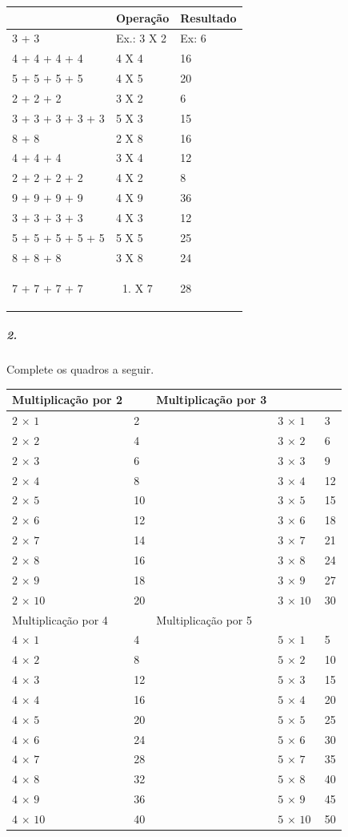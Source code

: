 \begin{longtable}[]{@{}lll@{}}
\toprule
& Operação & Resultado\tabularnewline
\midrule
\endhead
3 + 3 & Ex.: 3 X 2 & Ex: 6\tabularnewline
4 + 4 + 4 + 4 & 4 X 4 & 16\tabularnewline
5 + 5 + 5 + 5 & 4 X 5 & 20\tabularnewline
2 + 2 + 2 & 3 X 2 & 6\tabularnewline
3 + 3 + 3 + 3 + 3 & 5 X 3 & 15\tabularnewline
8 + 8 & 2 X 8 & 16\tabularnewline
4 + 4 + 4 & 3 X 4 & 12\tabularnewline
2 + 2 + 2 + 2 & 4 X 2 & 8\tabularnewline
9 + 9 + 9 + 9 & 4 X 9 & 36\tabularnewline
3 + 3 + 3 + 3 & 4 X 3 & 12\tabularnewline
5 + 5 + 5 + 5 + 5 & 5 X 5 & 25\tabularnewline
8 + 8 + 8 & 3 X 8 & 24\tabularnewline
\begin{minipage}[t]{0.32\columnwidth}\raggedright\strut
7 + 7 + 7 + 7\strut
\end{minipage} & \begin{minipage}[t]{0.32\columnwidth}\raggedright\strut
\begin{enumerate}
\def\labelenumi{\arabic{enumi}.}
\setcounter{enumi}{3}
\item
  X 7
\end{enumerate}\strut
\end{minipage} & \begin{minipage}[t]{0.32\columnwidth}\raggedright\strut
28\strut
\end{minipage}\tabularnewline
\bottomrule
\end{longtable}

\subparagraph{2.}\label{section-90}

Complete os quadros a seguir.

\begin{longtable}[]{@{}lllll@{}}
\toprule
Multiplicação por 2 & & Multiplicação por 3\tabularnewline
\midrule
\endhead
\(2\, \times \, 1\ \) & 2 & & \(3\, \times \, 1\ \) & 3\tabularnewline
\(2\, \times \, 2\ \) & 4 & & \(3\, \times \, 2\ \) & 6\tabularnewline
\(2\, \times \, 3\ \) & 6 & & \(3\, \times \, 3\ \) & 9\tabularnewline
\(2\, \times \, 4\ \) & 8 & & \(3\, \times \, 4\ \) & 12\tabularnewline
\(2\, \times \, 5\ \) & 10 & & \(3\, \times \, 5\ \) & 15\tabularnewline
\(2\, \times \, 6\ \) & 12 & & \(3\, \times \, 6\ \) & 18\tabularnewline
\(2\, \times \, 7\ \) & 14 & & \(3\, \times \, 7\ \) & 21\tabularnewline
\(2\, \times \, 8\ \) & 16 & & \(3\, \times \, 8\ \) & 24\tabularnewline
\(2\, \times \, 9\ \) & 18 & & \(3\, \times \, 9\ \) & 27\tabularnewline
\(2\, \times \, 10\ \) & 20 & & \(3\, \times \, 10\ \) &
30\tabularnewline
Multiplicação por 4 & & Multiplicação por 5\tabularnewline
\(4\, \times \, 1\ \) & 4 & & \(5\, \times \, 1\ \) & 5\tabularnewline
\(4\, \times \, 2\ \) & 8 & & \(5\, \times \, 2\ \) & 10\tabularnewline
\(4\, \times \, 3\ \) & 12 & & \(5\, \times \, 3\ \) & 15\tabularnewline
\(4\, \times \, 4\ \) & 16 & & \(5\, \times \, 4\ \) & 20\tabularnewline
\(4\, \times \, 5\ \) & 20 & & \(5\, \times \, 5\ \) & 25\tabularnewline
\(4\, \times \, 6\ \) & 24 & & \(5\, \times \, 6\ \) & 30\tabularnewline
\(4\, \times \, 7\ \) & 28 & & \(5\, \times \, 7\ \) & 35\tabularnewline
\(4\, \times \, 8\ \) & 32 & & \(5\, \times \, 8\ \) & 40\tabularnewline
\(4\, \times \, 9\ \) & 36 & & \(5\, \times \, 9\ \) & 45\tabularnewline
\(4\, \times \, 10\ \) & 40 & & \(5\, \times \, 10\ \) &
50\tabularnewline
\bottomrule
\end{longtable}

